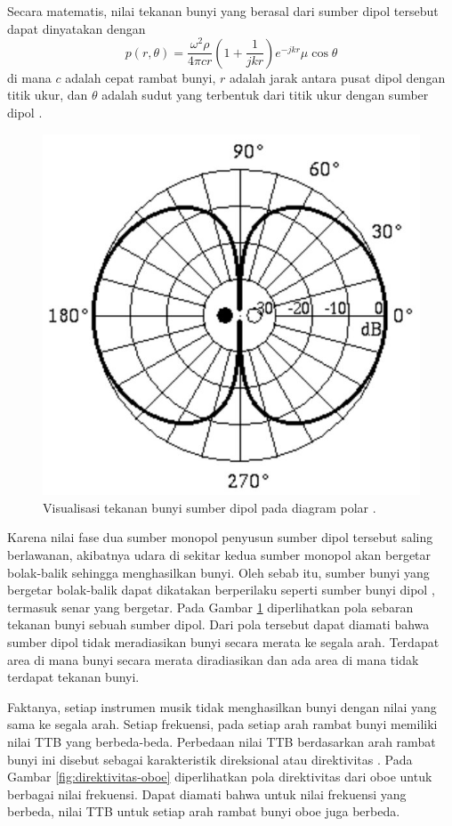 Secara matematis, nilai tekanan bunyi yang berasal dari sumber dipol tersebut dapat dinyatakan dengan 
\begin{equation}
    p(r,\theta)=\frac{\omega^2 \rho}{4 \pi c r}\left(1+\frac{1}{jkr}\right)e^{-jkr}\mu\cos\theta
    \label{eq:dipol}
\end{equation}
di mana $c$ adalah cepat rambat bunyi, $r$ adalah jarak antara pusat dipol dengan titik ukur, dan $\theta$ adalah sudut yang terbentuk dari titik ukur dengan sumber dipol \cite{bukuFletcher}. \par 
\begin{figure}[b!]
    \centering
    \includegraphics[width= 5 cm]{Gambar/dipol.jpg}
    \caption{Visualisasi tekanan bunyi sumber dipol pada diagram polar \cite{danRussel-pole}.}
    \label{fig:dipol}
\end{figure}
Karena nilai fase dua sumber monopol penyusun sumber dipol tersebut saling berlawanan, akibatnya udara di sekitar kedua sumber monopol akan bergetar bolak-balik sehingga menghasilkan bunyi. Oleh sebab itu, sumber bunyi yang bergetar bolak-balik dapat dikatakan berperilaku seperti sumber bunyi dipol \cite{danRussel-pole}, termasuk senar yang bergetar. Pada Gambar \ref{fig:dipol} diperlihatkan pola sebaran tekanan bunyi sebuah sumber dipol. Dari pola tersebut dapat diamati bahwa sumber dipol tidak meradiasikan bunyi secara merata ke segala arah. Terdapat area di mana bunyi secara merata diradiasikan dan ada area di mana tidak terdapat tekanan bunyi. \par
Faktanya, setiap instrumen musik tidak menghasilkan bunyi dengan nilai yang sama ke segala arah. Setiap frekuensi, pada setiap arah rambat bunyi memiliki nilai TTB yang berbeda-beda. Perbedaan nilai TTB berdasarkan arah rambat bunyi ini disebut sebagai karakteristik direksional atau direktivitas \cite{meyer}. Pada Gambar \ref{fig:direktivitas-oboe} diperlihatkan pola direktivitas dari oboe untuk berbagai nilai frekuensi. Dapat diamati bahwa untuk nilai frekuensi yang berbeda, nilai TTB untuk setiap arah rambat bunyi oboe juga berbeda. \par
